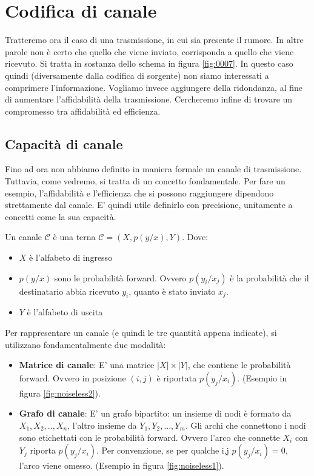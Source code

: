 \chapter{Codifica di canale}
Tratteremo ora il caso di una trasmissione, in cui sia presente il rumore. In altre parole non è certo che quello che viene inviato, 
corrisponda a quello che viene ricevuto. Si tratta in sostanza dello schema in figura \ref{fig:0007}.
In questo caso quindi (diversamente dalla codifica di sorgente) non siamo interessati a comprimere l'informazione. Vogliamo invece 
aggiungere della ridondanza, al fine di aumentare l'affidabilità della trasmissione.
Cercheremo infine di trovare un compromesso tra affidabilità ed efficienza.

\section{Capacità di canale}
Fino ad ora non abbiamo definito in maniera formale un canale di trasmissione. Tuttavia, come vedremo, si tratta di un concetto fondamentale. Per fare un esempio, l'affidabilità e l'efficienza che si possono raggiungere dipendono strettamente dal canale.
E' quindi utile definirlo con precisione, unitamente a concetti come la sua capacità.

\begin{definizione}[Canale]
 Un canale $\mathcal{C}$ è una terna $\mathcal{C}=(X,p(y/x),Y)$. Dove:
 \begin{itemize}
  \item $X$ è l'alfabeto di ingresso
  \item $p(y/x)$ sono le probabilità forward. Ovvero $p(y_i/x_j)$ è la probabilità che il destinatario 
        abbia ricevuto $y_i$, quanto è stato inviato $x_j$.
  \item $Y$ è l'alfabeto di uscita
 \end{itemize}
\end{definizione}

\noindent
Per rappresentare un canale (e quindi le tre quantità appena indicate), si utilizzano fondamentalmente due modalità:
\begin{itemize}
 \item \textbf{Matrice di canale}: E' una matrice $|X| \times |Y|$, che contiene le probabilità forward.
                          Ovvero in posizione $(i,j)$ è riportata $p(y_j/x_i)$. (Esempio in figura \ref{fig:noiseless2}).
 \item \textbf{Grafo di canale}: E' un grafo bipartito: un insieme di nodi è formato da $X_1,X_2,..,X_n$, l'altro insieme 
                        da $Y_1,Y_2,...,Y_m$.
                        Gli archi che connettono i nodi sono etichettati con le probabilità forward. Ovvero l'arco che connette
                        $X_i$ con $Y_j$ riporta $p(y_j/x_i)$. Per convenzione, se per qualche i,j $p(y_j/x_i)=0$, l'arco viene omesso.
                       (Esempio in figura \ref{fig:noiseless1}).
\end{itemize}


